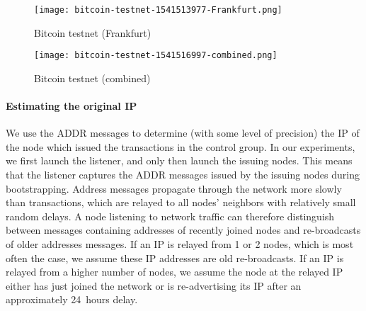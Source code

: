 \begin{figure*}
	\centering
	\begin{minipage}{0.5\textwidth}
		\centering
		\texttt{[image: bitcoin-testnet-1541513977-Frankfurt.png]}
		\caption{Bitcoin testnet (Frankfurt)}
	\end{minipage}\hfill
	\begin{minipage}{0.5\textwidth}
		\centering
		\texttt{[image: bitcoin-testnet-1541516997-combined.png]}
		\caption{Bitcoin testnet (combined)}
	\end{minipage}\hfill
	\label{fig:bitcoin-testnet-2}
\end{figure*}


\paragraph{Estimating the original IP}

We use the ADDR messages to determine (with some level of precision) the IP of the node which issued the transactions in the control group.
In our experiments, we first launch the listener, and only then launch the issuing nodes.
This means that the listener captures the ADDR messages issued by the issuing nodes during bootstrapping.
Address messages propagate through the network more slowly than transactions, which are relayed to all nodes' neighbors with relatively small random delays.
A node listening to network traffic can therefore distinguish between messages containing addresses of recently joined nodes and re-broadcasts of older addresses messages.
If an IP is relayed from 1 or 2 nodes, which is most often the case, we assume these IP addresses are old re-broadcasts.
If an IP is relayed from a higher number of nodes, we assume the node at the relayed IP either has just joined the network or is re-advertising its IP after an approximately 24~hours delay.


